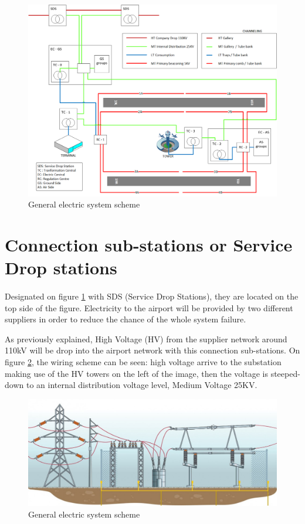 	\begin{figure}[H]
		\centering
		\includegraphics[clip, trim=0cm 0cm 0cm 0cm, width=1.15\textwidth]{./images/electric/esquema_electrico}
		\caption{General electric system scheme}
		\label{electricScheme}
	\end{figure}
	
		
	\section{Connection sub-stations or Service Drop stations}
	\paragraph{} Designated on figure \ref{electricScheme} with SDS (Service Drop Stations), they are located on the top side of the figure. Electricity to the airport will be provided by two different suppliers in order to reduce the chance of the whole system failure.
	
	As previously explained, High Voltage (HV) from the supplier network around 110kV will be drop into the airport network with this connection sub-stations. On figure \ref{substation}, the wiring scheme can be seen: high voltage arrive to the substation making use of the HV towers on the left of the image, then the voltage is steeped-down to an internal distribution voltage level, Medium Voltage 25KV.

	\begin{figure}[H]
		\centering
		\includegraphics[clip, trim=0cm 0cm 0cm 0cm, width=.8\textwidth]{./images/electric/substation}
		\caption{General electric system scheme}
		\label{substation}
	\end{figure}
	
